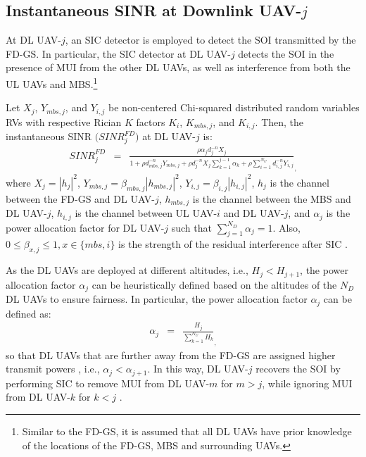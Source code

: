 \subsection{Instantaneous SINR at Downlink UAV-$j$}

At DL UAV-$j$, an SIC detector is employed to detect the SOI transmitted by the FD-GS. In particular, the SIC detector at DL UAV-$j$ detects the SOI in the presence of MUI from the other DL UAVs, as well as interference from both the UL UAVs and MBS.\footnote{Similar to the FD-GS, it is assumed that all DL UAVs have prior knowledge of the locations of the FD-GS, MBS and surrounding UAVs.}

Let $X_{j}$, $Y_{mbs,j}$, and $Y_{i,j}$ be non-centered Chi-squared distributed random variables RVs with respective Rician $K$ factors $K_{i}$, $K_{mbs,j}$, and $K_{i,j}$. Then, the instantaneous SINR $\Big(SINR_j^{FD}\Big)$ at DL UAV-$j$ is:
\begin{eqnarray} \label{NOMA_aided_multi_UAV_FD_HetNet_fd_noma_uav_j_sinr}
SINR_j^{FD} & = & \frac{\rho  \alpha_j d_j^{-n} X_j}{1 + \rho  d_{mbs,j}^{-n} Y_{mbs,j} +  \rho  d_j^{-n} X_j \sum_{k=1}^{j-1}\alpha_k + \rho  \sum_{i=1}^{N_U} d_{i,j}^{-n} Y_{i,j}}_,
\end{eqnarray}
where $X_j = |h_j|^2$, $Y_{mbs,j} = \beta_{mbs,j}|h_{mbs,j}|^2$, $Y_{i,j} = \beta_{i,j} |h_{i,j}|^2$, $h_{j}$ is the channel between the FD-GS and DL UAV-$j$, $h_{mbs,j}$ is the channel between the MBS and DL UAV-$j$, $h_{i,j}$ is the channel between UL UAV-$i$ and DL UAV-$j$, and $\alpha_j$ is the power allocation factor for DL UAV-$j$ such that $\sum_{j=1}^{N_D} \alpha_j = 1$. Also, $0 \leq \beta_{x,j} \leq 1, x \in \{mbs,i\}$ is the strength of the residual interference after SIC \cite{wang2017sir,kader2018coordinated,kader2018full,im2019outage}. 

As the DL UAVs are deployed at different altitudes, i.e., $H_{j} < H_{j+1}$, the power allocation factor $\alpha_j$ can be heuristically defined based on the altitudes of the $N_D$ DL UAVs to ensure fairness. In particular, the power allocation factor $\alpha_j$ can be defined as:
\begin{eqnarray}
\alpha_j & = & \frac{H_j}{\sum_{k=1}^{N_U} H_k}_,
\end{eqnarray}
so that DL UAVs that are further away from the FD-GS are assigned higher transmit powers \cite{liu2018heterogeneous}, i.e., $\alpha_j < \alpha_{j+1}$. In this way, DL UAV-$j$ recovers the SOI by performing SIC to remove MUI from DL UAV-$m$ for $m>j$, while ignoring MUI from DL UAV-$k$ for $k<j$ \cite{salehi2019meta,islam2017power}.

